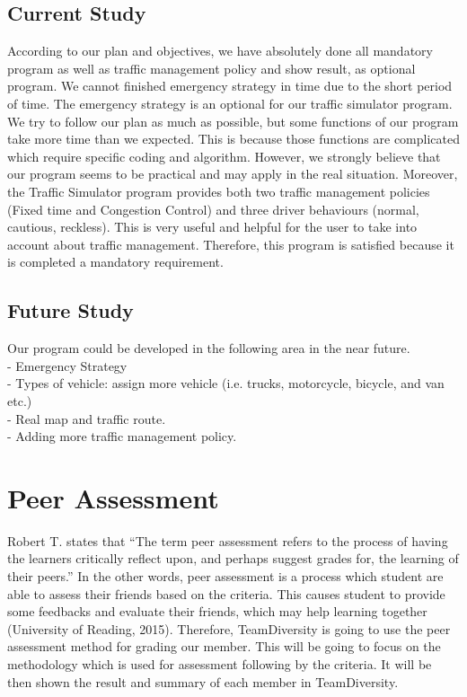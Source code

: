 \documentclass[11pt]{article}
\begin{document}
	\subsection{Current Study}
	\indent\indent According to our plan and objectives, we have absolutely done all mandatory program as well as traffic management policy and show result, as optional program. We cannot finished emergency strategy in time due to the short period of time. The emergency strategy is an optional for our traffic simulator program. We try to follow our plan as much as possible, but some functions of our program take more time than we expected. This is because those functions are complicated which require specific coding and algorithm. However, we strongly believe  that our program seems to be practical and may apply in the real situation. Moreover, the Traffic Simulator program provides both two traffic management policies (Fixed time and Congestion Control)  and three driver behaviours (normal, cautious, reckless). This is very useful and helpful for the user to take into account about traffic management. Therefore, this program is satisfied because it is completed a mandatory requirement.   
	\subsection{Future Study}
	\indent\indent Our program could be developed in the following area in the near future.\\ 
		\indent\indent - Emergency Strategy\\
		\indent\indent - Types of vehicle: assign more vehicle (i.e. trucks, motorcycle, bicycle, and van etc.)\\
		\indent\indent - Real map and traffic route.\\
		\indent\indent - Adding more traffic management policy. 
    

\newpage	
\section{Peer Assessment}

\indent\indent Robert T. \cite{roberts2006self} states that “The term peer assessment refers to the process of having the learners critically reflect upon, and perhaps suggest grades for, the learning of their peers.” In the other words, peer assessment is a process which student are able to assess their friends based on the criteria. This causes student to provide some feedbacks and evaluate their friends, which may help learning together (University of Reading, 2015). Therefore, TeamDiversity is going to use the peer assessment method for grading our member. This will be going to focus on the methodology which is used for assessment following by the criteria. It will be then shown the result and summary of each member in TeamDiversity. 
\end{document}
